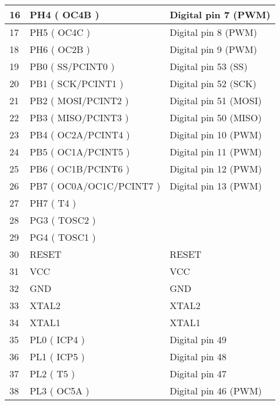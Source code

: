 \begin{longtable}[c]{|l|l|l|}
    16         & PH4 ( OC4B )             & Digital pin 7 (PWM)   \\ \hline
    17         & PH5 ( OC4C )             & Digital pin 8 (PWM)   \\ \hline
    18         & PH6 ( OC2B )             & Digital pin 9 (PWM)   \\ \hline
    19         & PB0 ( SS/PCINT0 )        & Digital pin 53 (SS)   \\ \hline
    20         & PB1 ( SCK/PCINT1 )       & Digital pin 52 (SCK)  \\ \hline
    21         & PB2 ( MOSI/PCINT2 )      & Digital pin 51 (MOSI) \\ \hline
    22         & PB3 ( MISO/PCINT3 )      & Digital pin 50 (MISO) \\ \hline
    23         & PB4 ( OC2A/PCINT4 )      & Digital pin 10 (PWM)  \\ \hline
    24         & PB5 ( OC1A/PCINT5 )      & Digital pin 11 (PWM)  \\ \hline
    25         & PB6 ( OC1B/PCINT6 )      & Digital pin 12 (PWM)  \\ \hline
    26         & PB7 ( OC0A/OC1C/PCINT7 ) & Digital pin 13 (PWM)  \\ \hline
    27         & PH7 ( T4 )               &                       \\ \hline
    28         & PG3 ( TOSC2 )            &                       \\ \hline
    29         & PG4 ( TOSC1 )            &                       \\ \hline
    30         & RESET                    & RESET                 \\ \hline
    31         & VCC                      & VCC                   \\ \hline
    32         & GND                      & GND                   \\ \hline
    33         & XTAL2                    & XTAL2                 \\ \hline
    34         & XTAL1                    & XTAL1                 \\ \hline
    35         & PL0 ( ICP4 )             & Digital pin 49        \\ \hline
    36         & PL1 ( ICP5 )             & Digital pin 48        \\ \hline
    37         & PL2 ( T5 )               & Digital pin 47        \\ \hline
    38         & PL3 ( OC5A )             & Digital pin 46 (PWM)  \\ \hline

\end{longtable}
